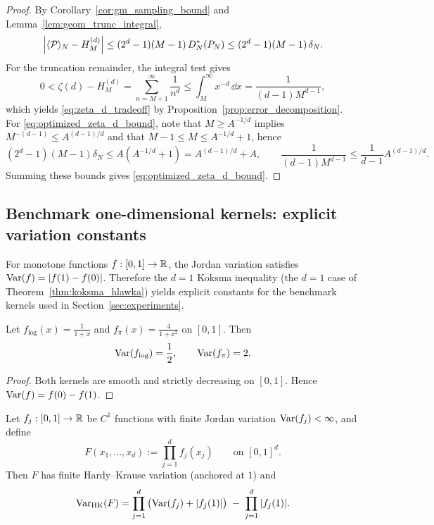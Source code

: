 \begin{proof}
By Corollary~\ref{cor:gm_sampling_bound} and Lemma~\ref{lem:geom_trunc_integral},
\[
\left|\langle \mathcal{P} \rangle_N-H_M^{(d)}\right|
\le (2^d-1)(M-1)\,D_N^\ast(P_N)
\le (2^d-1)(M-1)\,\delta_N.
\]
For the truncation remainder, the integral test gives
\[
0<\zeta(d)-H_M^{(d)}
=\sum_{n=M+1}^\infty \frac{1}{n^d}
\le \int_M^\infty x^{-d}\,\dd x
=\frac{1}{(d-1)M^{d-1}},
\]
which yields \eqref{eq:zeta_d_tradeoff} by Proposition~\ref{prop:error_decomposition}.
For \eqref{eq:optimized_zeta_d_bound}, note that $M\ge A^{-1/d}$ implies $M^{-(d-1)}\le A^{(d-1)/d}$ and that $M-1\le M\le A^{-1/d}+1$, hence
\[
(2^d-1)(M-1)\delta_N \le A\left(A^{-1/d}+1\right)=A^{(d-1)/d}+A,
\qquad
\frac{1}{(d-1)M^{d-1}}\le \frac{1}{d-1}A^{(d-1)/d}.
\]
Summing these bounds gives \eqref{eq:optimized_zeta_d_bound}.
\end{proof}

\subsection{Benchmark one-dimensional kernels: explicit variation constants}
\label{sec:benchmark_variation_constants}

For monotone functions $f:[0,1]\to\mathbb{R}$, the Jordan variation satisfies $\mathrm{Var}(f)=|f(1)-f(0)|$. Therefore the $d=1$ Koksma inequality (the $d=1$ case of Theorem~\ref{thm:koksma_hlawka}) yields explicit constants for the benchmark kernels used in Section~\ref{sec:experiments}.

\begin{proposition}
\label{prop:explicit_1d_variations}
Let $f_{\log}(x)=\frac{1}{1+x}$ and $f_\pi(x)=\frac{4}{1+x^2}$ on $[0,1]$. Then
\begin{equation}
\label{eq:explicit_1d_variations}
\mathrm{Var}(f_{\log})=\frac{1}{2},
\qquad
\mathrm{Var}(f_\pi)=2.
\end{equation}
\end{proposition}

\begin{proof}
Both kernels are smooth and strictly decreasing on $[0,1]$. Hence $\mathrm{Var}(f)=f(0)-f(1)$.
\end{proof}

\begin{proposition}
\label{prop:hkvar_separable_product}
Let $f_j:[0,1]\to\mathbb{R}$ be $C^1$ functions with finite Jordan variation $\mathrm{Var}(f_j)<\infty$, and define
\[
F(x_1,\dots,x_d):=\prod_{j=1}^d f_j(x_j)
\qquad\text{on }[0,1]^d.
\]
Then $F$ has finite Hardy--Krause variation (anchored at $1$) and
\begin{equation}
\label{eq:hkvar_separable_product}
\mathrm{Var}_{\mathrm{HK}}(F)
=
\prod_{j=1}^d\big(\mathrm{Var}(f_j)+|f_j(1)|\big)
\;-\;
\prod_{j=1}^d|f_j(1)|.
\end{equation}
\end{proposition}

